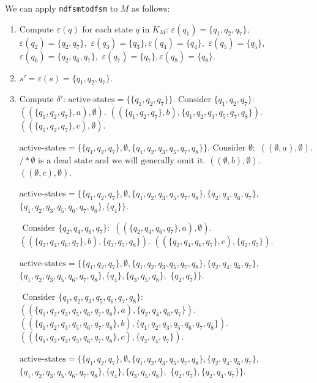 \documentclass[hidelinks,12pt]{article}
\begin{document}
We can apply \texttt{ndfsmtodfsm} to \( M \) as follows:
\begin{enumerate}
    \item Compute \( \varepsilon(q) \) for each state \( q \) in \( K_M \):
    $ \varepsilon(q_1) = \{q_1, q_2, q_7\}, $
    $ \varepsilon(q_2) = \{q_2, q_7\}, $
    $ \varepsilon(q_3) = \{q_3\}, \varepsilon(q_4) = \{q_4\}, $
    $ \varepsilon(q_5) = \{q_5\}, $
    $ \varepsilon(q_6) = \{q_2, q_6, q_7\}, $
    $ \varepsilon(q_7) = \{q_7\}, \varepsilon(q_8) = \{q_8\}. $

    \item \( s' = \varepsilon(s) = \{q_1, q_2, q_7\} \).

    \item Compute \( \delta' \):
    $ \text{active-states} = \{\{q_1, q_2, q_7\}\}. 

		\text{ Consider } \{q_1, q_2, q_7\}: $
    $ ((\{q_1, q_2, q_7\}, a), \emptyset). $
    $ ((\{q_1, q_2, q_7\}, b), \{q_1, q_2, q_3, q_5, q_7, q_8\}). $
    $ ((\{q_1, q_2, q_7\}, c), \emptyset). $

    $ \text{active-states} = \{\{q_1, q_2, q_7\}, \emptyset, \{q_1, q_2, q_3, q_5, q_7, q_8\}\}. 

				\text{ Consider } \emptyset: $
    $ ((\emptyset, a), \emptyset). $
    $ /* \emptyset \text{ is a dead state and we will generally omit it.} $
    $ ((\emptyset, b), \emptyset). $
    $ ((\emptyset, c), \emptyset). $

    $ \text{active-states} = \{\{q_1, q_2, q_7\}, \emptyset, \{q_1, q_2, q_3, q_5, q_7, q_8\}, \{q_2, q_4, q_6, q_7\}, $
    $ \{q_1, q_2, q_3, q_5, q_6, q_7, q_8\}, \{q_4\}\}.$ 

		$\text{ Consider } \{q_2, q_4, q_6, q_7\}: $
    $ ((\{q_2, q_4, q_6, q_7\}, a), \emptyset). $
    $ ((\{q_2, q_4, q_6, q_7\}, b), \{q_3, q_5, q_8\}). $
    $ ((\{q_2, q_4, q_6, q_7\}, c), \{q_2, q_7\}). $

    $ \text{active-states} = \{\{q_1, q_2, q_7\}, \emptyset, \{q_1, q_2, q_3, q_5, q_7, q_8\}, \{q_2, q_4, q_6, q_7\}, $
    $ \{q_1, q_2, q_3, q_5, q_6, q_7, q_8\}, \{q_4\}, \{q_3, q_5, q_8\}, $
    $ \{q_2, q_7\}\}.$

				$ \text{ Consider } \{q_1, q_2, q_3, q_5, q_6, q_7, q_8\}: $
    $ ((\{q_1, q_2, q_3, q_5, q_6, q_7, q_8\}, a), \{q_2, q_4, q_6, q_7\}). $
    $ ((\{q_1, q_2, q_3, q_5, q_6, q_7, q_8\}, b), \{q_1, q_2, q_3, q_5, q_6, q_7, q_8\}). $
    $ ((\{q_1, q_2, q_3, q_5, q_6, q_7, q_8\}, c), \{q_2, q_4, q_7\}). $

    $ \text{active-states} = \{\{q_1, q_2, q_7\}, \emptyset, \{q_1, q_2, q_3, q_5, q_7, q_8\}, \{q_2, q_4, q_6, q_7\}, $
    $ \{q_1, q_2, q_3, q_5, q_6, q_7, q_8\}, \{q_4\}, \{q_3, q_5, q_8\}, $
    $ \{q_2, q_7\}, \{q_2, q_4, q_7\}\}.$


\end{enumerate}
\end{document}
